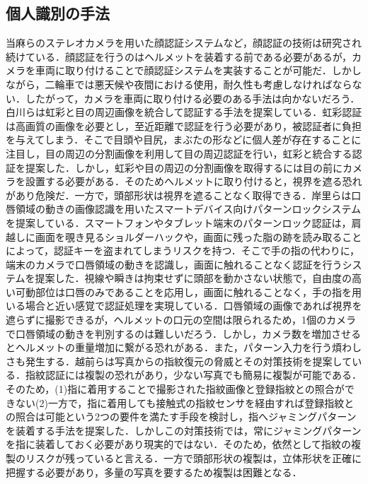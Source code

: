\documentclass[Japanese]{dicomopapers}
\begin{document}
\subsection{個人識別の手法}
当麻らのステレオカメラを用いた顔認証システム\cite{face}など，顔認証の技術は研究され続けている．顔認証を行うのはヘルメットを装着する前である必要があるが，カメラを車両に取り付けることで顔認証システムを実装することが可能だ．しかしながら，二輪車では悪天候や夜間における使用，耐久性も考慮しなければならない．したがって，カメラを車両に取り付ける必要のある手法は向かないだろう．白川らは虹彩と目の周辺画像を統合して認証する手法を提案している\cite{iris_eye}．虹彩認証は高画質の画像を必要とし，至近距離で認証を行う必要があり，被認証者に負担を与えてしまう．そこで目頭や目尻，まぶたの形などに個人差が存在することに注目し，目の周辺の分割画像を利用して目の周辺認証を行い，虹彩と統合する認証を提案した．しかし，虹彩や目の周辺の分割画像を取得するには目の前にカメラを設置する必要がある．そのためヘルメットに取り付けると，視界を遮る恐れがあり危険だ．一方で，頭部形状は視界を遮ることなく取得できる．岸里らは口唇領域の動きの画像認識を用いたスマートデバイス向けパターンロックシステムを提案している\cite{mouth_pattern}．スマートフォンやタブレット端末のパターンロック認証は，肩越しに画面を覗き見るショルダーハックや，画面に残った脂の跡を読み取ることによって，認証キーを盗まれてしまうリスクを持つ．そこで手の指の代わりに，端末のカメラで口唇領域の動きを認識し，画面に触れることなく認証を行うシステムを提案した．視線や瞬きは拘束せずに頭部を動かさない状態で，自由度の高い可動部位は口唇のみであることを応用し，画面に触れることなく，手の指を用いる場合と近い感覚で認証処理を実現している．口唇領域の画像であれば視界を遮らずに撮影できるが，ヘルメットの口元の空間は限られるため，1個のカメラで口唇領域の動きを判別するのは難しいだろう．しかし，カメラ数を増加させるとヘルメットの重量増加に繋がる恐れがある．また，パターン入力を行う煩わしさも発生する．越前らは写真からの指紋復元の脅威とその対策技術を提案している\cite{finger_print}．指紋認証には複製の恐れがあり，少ない写真でも簡易に複製が可能である．そのため，(1)指に着用することで撮影された指紋画像と登録指紋との照合ができない(2)一方で，指に着用しても接触式の指紋センサを経由すれば登録指紋との照合は可能という2つの要件を満たす手段を検討し，指へジャミングパターンを装着する手法を提案した．しかしこの対策技術では，常にジャミングパターンを指に装着しておく必要があり現実的ではない．そのため，依然として指紋の複製のリスクが残っていると言える．一方で頭部形状の複製は，立体形状を正確に把握する必要があり，多量の写真を要するため複製は困難となる．
\end{document}
